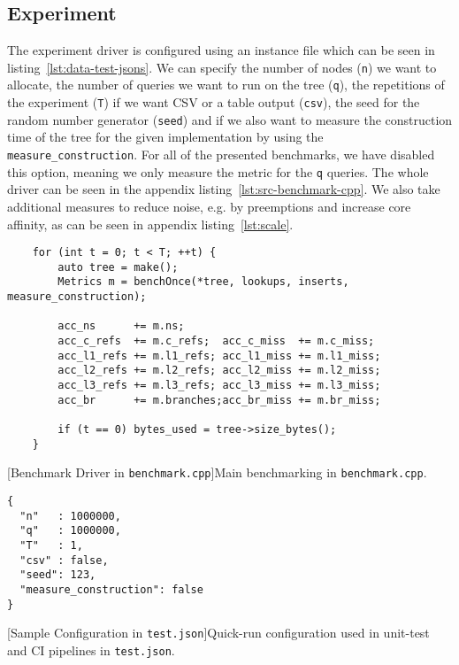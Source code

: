 \documentclass{article}
\begin{document}
\subsection{Experiment}
The experiment driver is configured using an instance file which can be seen in listing~\ref{lst:data-test-jsons}. We can specify the number of nodes (\texttt{n}) we want to allocate, the number of queries we want to run on the tree (\texttt{q}), the repetitions of the experiment (\texttt{T}) if we want CSV or a table output  (\texttt{csv}), the seed for the random number generator (\texttt{seed}) and if we also want to measure the construction time of the tree for the given implementation by using the \texttt{measure\_construction}. For all of the presented benchmarks, we have disabled this option, meaning we only measure the metric for the \texttt{q} queries. The whole driver can be seen in the appendix listing~\ref{lst:src-benchmark-cpp}. We also take additional measures to reduce noise, e.g. by preemptions and increase core affinity, as can be seen in appendix listing~\ref{lst:scale}.
\begin{lstlisting}
    for (int t = 0; t < T; ++t) {
        auto tree = make();
        Metrics m = benchOnce(*tree, lookups, inserts, measure_construction);

        acc_ns      += m.ns;
        acc_c_refs  += m.c_refs;  acc_c_miss  += m.c_miss;
        acc_l1_refs += m.l1_refs; acc_l1_miss += m.l1_miss;
        acc_l2_refs += m.l2_refs; acc_l2_miss += m.l2_miss;
        acc_l3_refs += m.l3_refs; acc_l3_miss += m.l3_miss;
        acc_br      += m.branches;acc_br_miss += m.br_miss;

        if (t == 0) bytes_used = tree->size_bytes();
    }
\end{lstlisting}
[Benchmark Driver in \texttt{benchmark.cpp}]{Main benchmarking in \texttt{benchmark.cpp}.}
\label{lst:src-benchmark-cpps}

\begin{lstlisting}
{
  "n"   : 1000000,
  "q"   : 1000000,
  "T"   : 1,
  "csv" : false,
  "seed": 123,
  "measure_construction": false
}
\end{lstlisting}
[Sample Configuration in \texttt{test.json}]{Quick-run configuration used in unit-test and CI pipelines in \texttt{test.json}.}
\label{lst:data-test-jsons}
\end{document}
